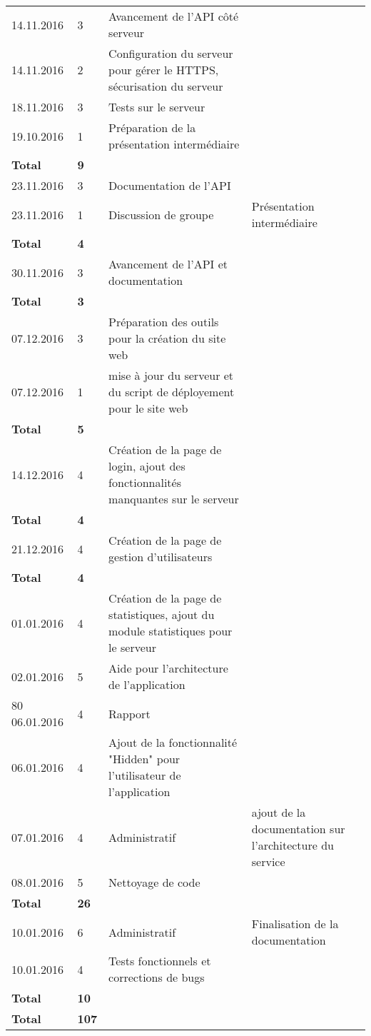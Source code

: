 \documentclass[french]{article}
\begin{document}
\begin{longtable}{p{}|p{}|p{}|p{}}
		14.11.2016 & 3 & Avancement de l'API côté serveur\\
		14.11.2016 & 2 & Configuration du serveur pour gérer le HTTPS, sécurisation du serveur\\
		18.11.2016 & 3 & Tests sur le serveur\\
		19.10.2016 & 1 &  Préparation de la présentation intermédiaire  \\
		\textbf{Total} & \textbf{9} &&\\
		\hline

		23.11.2016 & 3 & Documentation de l'API\\
		23.11.2016 & 1 & Discussion de groupe & Présentation intermédiaire\\
		\textbf{Total} & \textbf{4} &&\\
		\hline
		30.11.2016 & 3 & Avancement de l'API et documentation\\
		\textbf{Total} & \textbf{3} &&\\
		\hline
		07.12.2016 & 3 & Préparation des outils pour la création du site web\\
		07.12.2016 & 1 & mise à jour du serveur et du script de déployement pour le site web\\
		\textbf{Total} & \textbf{5} &&\\
		\hline
		14.12.2016 & 4 & Création de la page de login, ajout des fonctionnalités manquantes sur le serveur\\
		\textbf{Total} & \textbf{4} &&\\
		\hline
		21.12.2016 & 4 & Création de la page de gestion d'utilisateurs\\
		\textbf{Total} & \textbf{4} &&\\
		\hline
		01.01.2016 & 4 & Création de la page de statistiques, ajout du module statistiques pour le serveur\\
		02.01.2016 & 5 & Aide pour l'architecture de l'application\\80
		06.01.2016 & 4 & Rapport \\
		06.01.2016 & 4 & Ajout de la fonctionnalité "Hidden" pour l'utilisateur de l'application\\
		07.01.2016 & 4 & Administratif & ajout de la documentation sur l'architecture du service\\
		08.01.2016 & 5 & Nettoyage de code\\
		\textbf{Total} & \textbf{26} &&\\
		\hline
		10.01.2016 & 6 & Administratif & Finalisation de la documentation\\
		10.01.2016 & 4 & Tests fonctionnels et corrections de bugs\\
		\textbf{Total} & \textbf{10} &&\\
		\hline\hline
		\textbf{Total} & \textbf{107} &&\\

	\end{longtable}
\end{document}
